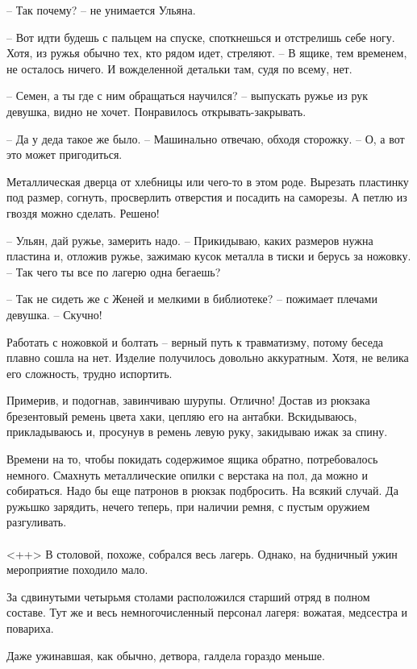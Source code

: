 \documentclass[a4paper]{book}
\begin{document}
-- Так почему? -- не унимается Ульяна.

-- Вот идти будешь с пальцем на спуске, споткнешься и отстрелишь себе ногу. Хотя, из ружья обычно тех, кто рядом идет, стреляют. -- В ящике, тем временем, не осталось ничего. И вожделенной детальки там, судя по всему, нет. 

-- Семен, а ты где с ним обращаться научился? -- выпускать ружье из рук девушка, видно не хочет. Понравилось открывать-закрывать.

-- Да у деда такое же было. -- Машинально отвечаю, обходя сторожку. -- О, а вот это может пригодиться. 

Металлическая дверца от хлебницы или чего-то в этом роде. Вырезать пластинку под размер, согнуть, просверлить отверстия и посадить на саморезы. А петлю из гвоздя можно сделать. Решено!

-- Ульян, дай ружье, замерить надо. -- Прикидываю, каких размеров нужна пластина и, отложив ружье, зажимаю кусок металла в тиски и берусь за ножовку. -- Так чего ты все по лагерю одна бегаешь?

-- Так не сидеть же с Женей и мелкими в библиотеке? -- пожимает плечами девушка. -- Скучно!

Работать с ножовкой и болтать -- верный путь к травматизму, потому беседа плавно сошла на нет. Изделие получилось довольно аккуратным. Хотя, не велика его сложность, трудно испортить.

Примерив, и подогнав, завинчиваю шурупы. Отлично! Достав из рюкзака брезентовый ремень цвета хаки, цепляю его на антабки. Вскидываюсь, прикладываюсь и, просунув в ремень левую руку, закидываю ижак за спину.

Времени на то, чтобы покидать содержимое ящика обратно, потребовалось немного. Смахнуть металлические опилки с верстака на пол, да можно и собираться. Надо бы еще патронов в рюкзак подбросить. На всякий случай. Да ружьшко зарядить, нечего теперь, при наличии ремня, с пустым оружием разгуливать.

\paragraph{}<++>
В столовой, похоже, собрался весь лагерь. Однако, на будничный ужин мероприятие походило мало. 

За сдвинутыми четырьмя столами расположился старший отряд в полном составе. Тут же и весь немногочисленный персонал лагеря: вожатая, медсестра и повариха. 

Даже ужинавшая, как обычно, детвора, галдела гораздо меньше. 
\end{document}
